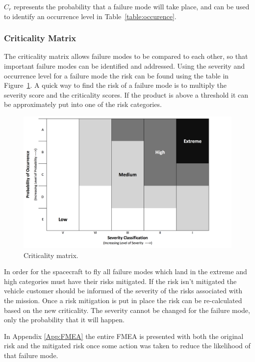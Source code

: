 \documentclass[paper=letter, fontsize=11pt]{scrartcl} %
\numberwithin{equation}{section} %
\numberwithin{figure}{section} %
\numberwithin{table}{section} %
\begin{document}
$C_r$ represents the probability that a failure mode will take place, and can be used to identify an occurrence level in Table~\ref{table:occurence}.

\subsubsection{Criticality Matrix}
The criticality matrix allows failure modes to be compared to each other, so that important failure modes can be identified and addressed. Using the severity and occurrence level for a failure mode the risk can be found using the table in Figure~\ref{fig:critMatrix}. A quick way to find the risk of a failure mode is to multiply the severity score and the criticality scores. If the product is above a threshold it can be approximately put into one of the risk categories.

\begin{figure}[H]
    \begin{center}
        \includegraphics [width=5.5in]{criticalityMatrix2.png}
        \caption{Criticality matrix.}
        \label{fig:critMatrix}
    \end{center}
\end{figure}

In order for the spacecraft to fly all failure modes which land in the extreme and high categories must have their risks mitigated. If the risk isn't mitigated the vehicle customer should be informed of the severity of the risks associated with the mission. Once a risk mitigation is put in place the risk can be re-calculated based on the new criticality. The severity cannot be changed for the failure mode, only the probability that it will happen.

In Appendix \ref{App:FMEA} the entire FMEA is presented with both the original risk and the mitigated risk once some action was taken to reduce the likelihood of that failure mode.
\end{document}
